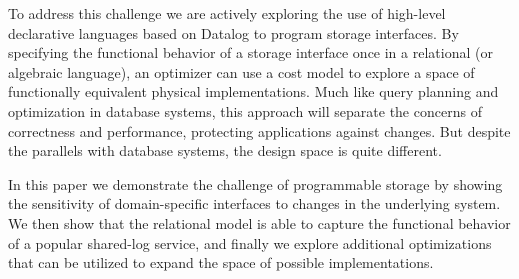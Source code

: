 To address this challenge we are actively exploring the use of high-level
declarative languages based on Datalog to program storage interfaces. By specifying
the functional behavior of a storage interface once in a relational (or
algebraic language), an optimizer can use a cost model to explore a space of
functionally equivalent physical implementations. Much like query planning and
optimization in database systems, this approach will separate the concerns of
correctness and performance, protecting applications against changes. But
despite the parallels with database systems, the design space is quite
different.

In this paper we demonstrate the challenge of programmable storage by showing
the sensitivity of domain-specific interfaces to changes in the underlying
system. We then show that the relational model is able to capture the
functional behavior of a popular shared-log service, and finally we explore
additional optimizations that can be utilized to expand the space of
possible implementations.
